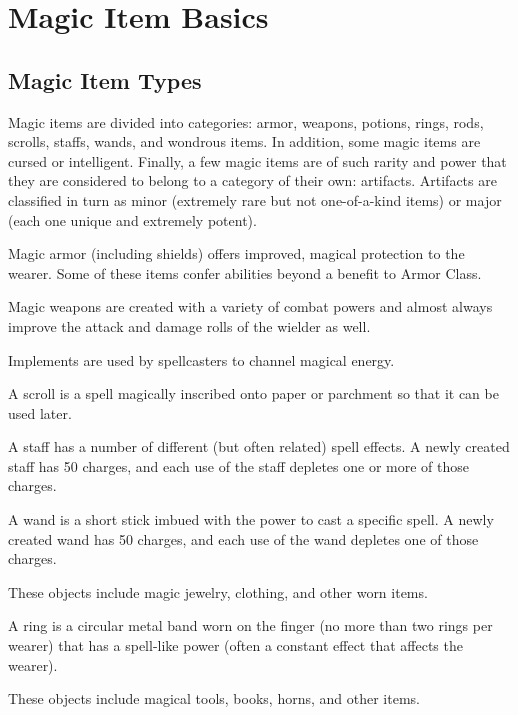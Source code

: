 \chapter{Magic Item Basics}

\section{Magic Item Types}
Magic items are divided into categories: armor, weapons, potions, rings, rods, scrolls, staffs, wands, and wondrous items. In addition, some magic items are cursed or intelligent. Finally, a few magic items are of such rarity and power that they are considered to belong to a category of their own: artifacts. Artifacts are classified in turn as minor (extremely rare but not one-of-a-kind items) or major (each one unique and extremely potent).


 Magic armor (including shields) offers improved, magical protection to the wearer. Some of these items confer abilities beyond a benefit to Armor Class.

 Magic weapons are created with a variety of combat powers and almost always improve the attack and damage rolls of the wielder as well.

 Implements are used by spellcasters to channel magical energy.

 A scroll is a spell magically inscribed onto paper or parchment so that it can be used later.

 A staff has a number of different (but often related) spell effects. A newly created staff has 50 charges, and each use of the staff depletes one or more of those charges.

 A wand is a short stick imbued with the power to cast a specific spell. A newly created wand has 50 charges, and each use of the wand depletes one of those charges.

 These objects include magic jewelry, clothing, and other worn items.

 A ring is a circular metal band worn on the finger (no more than two rings per wearer) that has a spell-like power (often a constant effect that affects the wearer).

 These objects include magical tools, books, horns, and other items.


